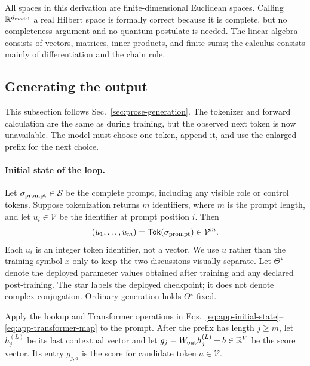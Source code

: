 \documentclass[
  aps,
  reprint,
  superscriptaddress,
  floatfix,
  nofootinbib,
  longbibliography
]{revtex4-2}
\newcommand{\R}{\mathbb{R}}
\begin{document}
All spaces in this derivation are finite-dimensional Euclidean spaces.
Calling $\R^{d_{\rm model}}$ a real Hilbert space is formally correct because it is complete,
but no completeness argument and no quantum postulate is needed.  The linear
algebra consists of vectors, matrices, inner products, and finite sums; the
calculus consists mainly of differentiation and the chain rule.

\subsection{Generating the output}
\label{app:generation}

This subsection follows Sec.~\ref{sec:prose-generation}.  The tokenizer and
forward calculation are the same as during training, but the observed next
token is now unavailable.  The model must choose one token, append it, and use
the enlarged prefix for the next choice.

\paragraph{Initial state of the loop.}
Let $\sigma_{\rm prompt}\in\mathcal S$ be the complete prompt, including any
visible role or control tokens.  Suppose tokenization returns $m$ identifiers,
where $m$ is the prompt length, and let $u_i\in\mathcal V$ be the identifier at
prompt position $i$.  Then
\begin{equation}
\label{eq:app-prompt-tokenization}
(u_1,\ldots,u_m)=\mathsf{Tok}(\sigma_{\rm prompt})
\in\mathcal V^m.
\end{equation}
Each $u_i$ is an integer token identifier, not a vector.  We use $u$ rather
than the training symbol $x$ only to keep the two discussions visually
separate.  Let $\Theta^\star$ denote the
deployed parameter values obtained after training and any declared
post-training.  The star labels the deployed checkpoint; it does not denote
complex conjugation.  Ordinary generation holds $\Theta^\star$ fixed.

Apply the lookup and Transformer operations in
Eqs.~\eqref{eq:app-initial-state}--\eqref{eq:app-transformer-map} to the prompt.
After the prefix has length $j\geq m$, let $h_j^{(L)}$ be its last contextual
vector and let
$g_j=W_{\rm out}h_j^{(L)}+b\in\R^V$ be the score vector.  Its entry $g_{j,a}$ is
the score for candidate token $a\in\mathcal V$.
\end{document}

